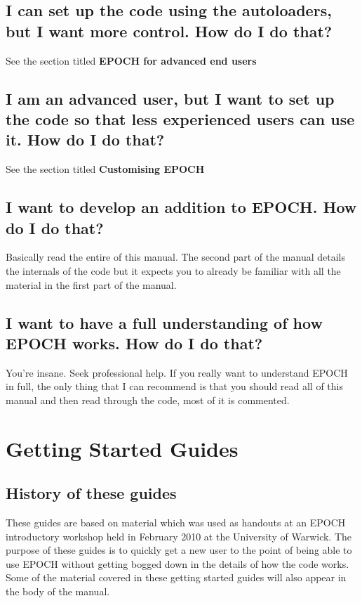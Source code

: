 \documentclass[12pt]{article}
\newcommand{\nEPOCH}{{\color{warwickdark}\fontfamily{phv}\selectfont EPOCH}}
\newcommand{\EPOCH}{{\nEPOCH} }
\begin{document}
\subsection{I can set up the code using the autoloaders, but I want more
  control. How do I do that?}
See the section titled {\bf \EPOCH for advanced end users}

\subsection{I am an advanced user, but I want to set up the code so that less
  experienced users can use it. How do I do that?}
See the section titled {\bf Customising \EPOCH}

\subsection{I want to develop an addition to \nEPOCH. How do I do that?}
Basically read the entire of this manual. The second part of the manual details
the internals of the code but it expects you to already be familiar with all
the material in the first part of the manual.

\subsection{I want to have a full understanding of how \EPOCH works. How do I
  do that?}
You're insane. Seek professional help. If you really want to understand \EPOCH
in full, the only thing that I can recommend is that you should read all of
this manual and then read through the code, most of it is commented.
\pagebreak

\section{Getting Started Guides}

\subsection{History of these guides}
These guides are based on material which was used as handouts at an \EPOCH
introductory workshop held in February 2010 at the University of Warwick. The
purpose of these guides is to quickly get a new user to the point of being able
to use \EPOCH without getting bogged down in the details of how the code
works. Some of the material covered in these getting started guides will also
appear in the body of the manual.
\end{document}

